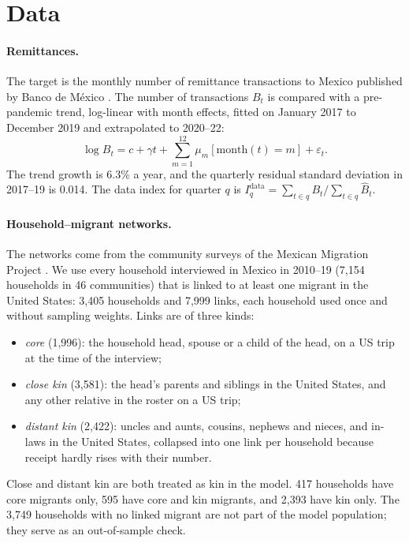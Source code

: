 
\section{Data}

\paragraph{Remittances.} The target is the monthly number of remittance transactions to Mexico published by Banco de M\'exico \citep{banxico}. The number of transactions $B_t$ is compared with a pre-pandemic trend, log-linear with month effects, fitted on January 2017 to December 2019 and extrapolated to 2020--22:
\begin{equation}
\log B_t = c + \gamma t + \textstyle\sum_{m=1}^{12} \mu_m [\mathrm{month}(t) = m] + \varepsilon_t .
\end{equation}
The trend growth is 6.3\% a year, and the quarterly residual standard deviation in 2017--19 is 0.014. The data index for quarter $q$ is $I^{\mathrm{data}}_q = \sum_{t \in q} B_t / \sum_{t \in q} \widehat B_t$.

\paragraph{Household--migrant networks.} The networks come from the community surveys of the Mexican Migration Project \citep{mmp}. We use every household interviewed in Mexico in 2010--19 (7,154 households in 46 communities) that is linked to at least one migrant in the United States: 3,405 households and 7,999 links, each household used once and without sampling weights. Links are of three kinds:
\begin{itemize}
\item \emph{core} (1,996): the household head, spouse or a child of the head, on a US trip at the time of the interview;
\item \emph{close kin} (3,581): the head's parents and siblings in the United States, and any other relative in the roster on a US trip;
\item \emph{distant kin} (2,422): uncles and aunts, cousins, nephews and nieces, and in-laws in the United States, collapsed into one link per household because receipt hardly rises with their number.
\end{itemize}
Close and distant kin are both treated as kin in the model. 417 households have core migrants only, 595 have core and kin migrants, and 2,393 have kin only. The 3,749 households with no linked migrant are not part of the model population; they serve as an out-of-sample check.

